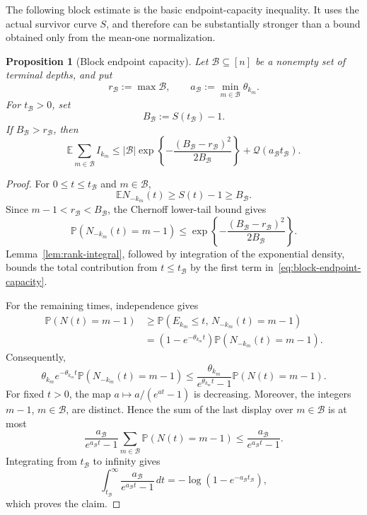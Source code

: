 \documentclass[11pt]{article}
\newtheorem{proposition}[theorem]{Proposition}
\theoremstyle{remark}
\theoremstyle{plain}
\newcommand{\E}{\mathbb E}
\newcommand{\Pp}{\mathbb P}
\begin{document}
The following block estimate is the basic endpoint-capacity inequality.  It
uses the actual survivor curve $S$, and therefore can be substantially
stronger than a bound obtained only from the mean-one normalization.

\begin{proposition}[Block endpoint capacity]
\label{prop:block-endpoint-capacity}
Let $\mathcal B\subseteq[n]$ be a nonempty set of terminal depths, and put
\[
 r_{\mathcal B}:=\max\mathcal B,
 \qquad
 a_{\mathcal B}:=\min_{m\in\mathcal B}\theta_{k_m}.
\]
For $t_{\mathcal B}>0$, set
\[
 B_{\mathcal B}:=S(t_{\mathcal B})-1.
\]
If $B_{\mathcal B}>r_{\mathcal B}$, then
\begin{equation}\label{eq:block-endpoint-capacity}
 \E\sum_{m\in\mathcal B}I_{k_m}
 \le
 |\mathcal B|
 \exp\left\{-\frac{(B_{\mathcal B}-r_{\mathcal B})^2}
                         {2B_{\mathcal B}}\right\}
 +\mathcal Q(a_{\mathcal B}t_{\mathcal B}).
\end{equation}
\end{proposition}

\begin{proof}
For $0\le t\le t_{\mathcal B}$ and $m\in\mathcal B$,
\[
 \E N_{-k_m}(t)\ge S(t)-1\ge B_{\mathcal B}.
\]
Since $m-1<r_{\mathcal B}<B_{\mathcal B}$, the Chernoff lower-tail bound
gives
\[
 \Pp(N_{-k_m}(t)=m-1)
 \le
 \exp\left\{-\frac{(B_{\mathcal B}-r_{\mathcal B})^2}
                         {2B_{\mathcal B}}\right\}.
\]
Lemma~\ref{lem:rank-integral}, followed by integration of the exponential
density, bounds the total contribution from $t\le t_{\mathcal B}$ by the
first term in~\eqref{eq:block-endpoint-capacity}.

For the remaining times, independence gives
\begin{align*}
 \Pp(N(t)=m-1)
 &\ge \Pp(E_{k_m}\le t,\,N_{-k_m}(t)=m-1)\\
 &= (1-e^{-\theta_{k_m}t})
    \Pp(N_{-k_m}(t)=m-1).
\end{align*}
Consequently,
\[
 \theta_{k_m}e^{-\theta_{k_m}t}
 \Pp(N_{-k_m}(t)=m-1)
 \le
 \frac{\theta_{k_m}}{e^{\theta_{k_m}t}-1}
 \Pp(N(t)=m-1).
\]
For fixed $t>0$, the map $a\mapsto a/(e^{at}-1)$ is decreasing.  Moreover,
the integers $m-1$, $m\in\mathcal B$, are distinct.  Hence the sum of the
last display over $m\in\mathcal B$ is at most
\[
 \frac{a_{\mathcal B}}{e^{a_{\mathcal B}t}-1}
 \sum_{m\in\mathcal B}\Pp(N(t)=m-1)
 \le \frac{a_{\mathcal B}}{e^{a_{\mathcal B}t}-1}.
\]
Integrating from $t_{\mathcal B}$ to infinity gives
\[
 \int_{t_{\mathcal B}}^\infty
 \frac{a_{\mathcal B}}{e^{a_{\mathcal B}t}-1}\,dt
 =-\log(1-e^{-a_{\mathcal B}t_{\mathcal B}}),
\]
which proves the claim.
\end{proof}
\end{document}
